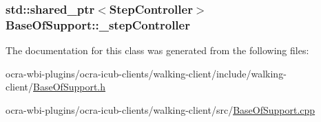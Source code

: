 \hypertarget{classBaseOfSupport_a023d28c6900f0e97d9de42ca2c5d94a5}{
\subsubsection[{\-\_\-step\-Controller}]{\setlength{\rightskip}{0pt plus 5cm}std\-::shared\-\_\-ptr$<${\bf \-Step\-Controller}$>$ {\bf \-Base\-Of\-Support\-::\-\_\-step\-Controller}}}\label{classBaseOfSupport_a023d28c6900f0e97d9de42ca2c5d94a5}


\-The documentation for this class was generated from the following files\-:\begin{DoxyCompactItemize}
\item 
ocra-\/wbi-\/plugins/ocra-\/icub-\/clients/walking-\/client/include/walking-\/client/\hyperlink{BaseOfSupport_8h}{\-Base\-Of\-Support.\-h}\item 
ocra-\/wbi-\/plugins/ocra-\/icub-\/clients/walking-\/client/src/\hyperlink{BaseOfSupport_8cpp}{\-Base\-Of\-Support.\-cpp}\end{DoxyCompactItemize}
